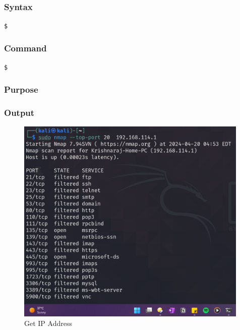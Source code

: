 \documentclass[11pt]{article}
\begin{document}
\subsection{}

\subsubsection*{Syntax}
\begin{verbatim}
$
\end{verbatim}

\subsubsection*{Command}
\begin{verbatim}
$
\end{verbatim}

\subsubsection*{Purpose}

\subsubsection*{Output}
\begin{figure}[H]
    \centering
    \includegraphics[width=0.99\textwidth]{a3_ss (7).png}
    \caption{Get IP Address}
    \label{fig:1}
\end{figure}
\end{document}

